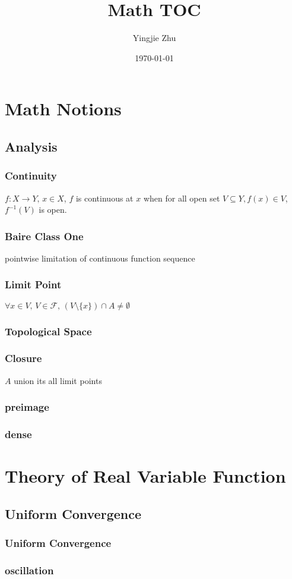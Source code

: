 \documentclass[11pt,a4paper]{article}
\title{Math TOC}
\author{Yingjie Zhu}
\date{\today}
\begin{document}
\maketitle
\tableofcontents

\section{Math Notions}

\subsection{Analysis}

\subsubsection{Continuity}

$f: X \to Y,\, x \in X$, $f$ is continuous at $x$ when for all open set $V \subseteq Y, f(x) \in V$, $f^{-1}(V)$ is open.

\subsubsection{Baire Class One}

pointwise limitation of continuous function sequence

\subsubsection{Limit Point}

$\forall x \in V,\, V \in \mathcal{F},\, \left( V \setminus \{ x\} \right) \cap A \ne \emptyset$

\subsubsection{Topological Space}

\subsubsection{Closure}

$A$ union its all limit points

\subsubsection{preimage}

\subsubsection{dense}

\section{Theory of Real Variable Function}

\subsection{Uniform Convergence}

\subsubsection{Uniform Convergence}

\subsubsection{oscillation}
\end{document}
